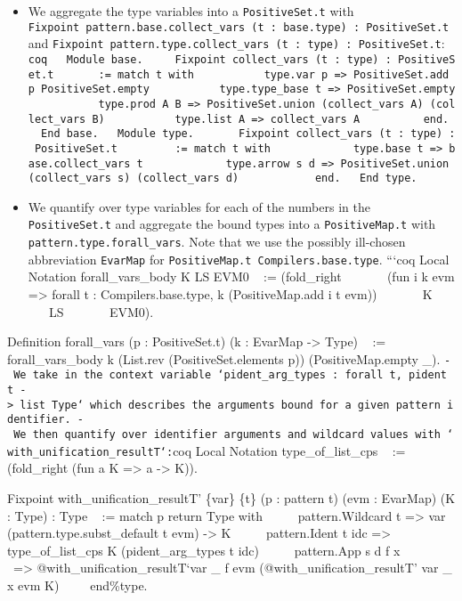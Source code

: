 \begin{itemize}
  \begin{itemize}
  \tightlist
  \item
    We aggregate the type variables into a \texttt{PositiveSet.t} with
    \texttt{Fixpoint\ pattern.base.collect\_vars\ (t\ :\ base.type)\ :\ PositiveSet.t}
    and
    \texttt{Fixpoint\ pattern.type.collect\_vars\ (t\ :\ type)\ :\ PositiveSet.t}:
    \texttt{coq\ \ \ Module\ base.\ \ \ ~\ Fixpoint\ collect\_vars\ (t\ :\ type)\ :\ PositiveSet.t\ \ \ ~\ ~\ :=\ match\ t\ with\ \ \ ~\ ~\ ~\ ~\textbar{}\ type.var\ p\ =\textgreater{}\ PositiveSet.add\ p\ PositiveSet.empty\ \ \ ~\ ~\ ~\ ~\textbar{}\ type.type\_base\ t\ =\textgreater{}\ PositiveSet.empty\ \ \ ~\ ~\ ~\ ~\textbar{}\ type.prod\ A\ B\ =\textgreater{}\ PositiveSet.union\ (collect\_vars\ A)\ (collect\_vars\ B)\ \ \ ~\ ~\ ~\ ~\textbar{}\ type.list\ A\ =\textgreater{}\ collect\_vars\ A\ \ \ ~\ ~\ ~\ ~end.\ \ \ End\ base.\ \ \ Module\ type.\ \ \ ~\ ~\ Fixpoint\ collect\_vars\ (t\ :\ type)\ :\ PositiveSet.t\ \ \ ~\ ~\ ~\ :=\ match\ t\ with\ \ \ ~\ ~\ ~\ ~\ ~\textbar{}\ type.base\ t\ =\textgreater{}\ base.collect\_vars\ t\ \ \ ~\ ~\ ~\ ~\ ~\textbar{}\ type.arrow\ s\ d\ =\textgreater{}\ PositiveSet.union\ (collect\_vars\ s)\ (collect\_vars\ d)\ \ \ ~\ ~\ ~\ ~\ ~end.\ \ \ End\ type.}
  \item
    We quantify over type variables for each of the numbers in the
    \texttt{PositiveSet.t} and aggregate the bound types into a
    \texttt{PositiveMap.t} with \texttt{pattern.type.forall\_vars}. Note
    that we use the possibly ill-chosen abbreviation \texttt{EvarMap}
    for \texttt{PositiveMap.t\ Compilers.base.type}. ```coq Local
    Notation forall\_vars\_body K LS EVM0 ~ := (fold\_right ~ ~ ~ ~ (fun
    i k evm =\textgreater{} forall t : Compilers.base.type, k
    (PositiveMap.add i t evm)) ~ ~ ~ ~ K ~ ~ ~ ~ LS ~ ~ ~ ~ EVM0).
  \end{itemize}

  Definition forall\_vars (p : PositiveSet.t) (k : EvarMap
  -\textgreater{} Type) ~ := forall\_vars\_body k (List.rev
  (PositiveSet.elements p)) (PositiveMap.empty \_).
  \texttt{-\ We\ take\ in\ the\ context\ variable\ `pident\_arg\_types\ :\ forall\ t,\ pident\ t\ -\textgreater{}\ list\ Type`\ which\ describes\ the\ arguments\ bound\ for\ a\ given\ pattern\ identifier.\ -\ We\ then\ quantify\ over\ identifier\ arguments\ and\ wildcard\ values\ with\ `with\_unification\_resultT`:}coq
  Local Notation type\_of\_list\_cps ~ := (fold\_right (fun a K
  =\textgreater{} a -\textgreater{} K)).

  Fixpoint with\_unification\_resultT' \{var\} \{t\} (p : pattern t)
  (evm : EvarMap) (K : Type) : Type ~ := match p return Type with ~ ~
  ~\textbar{} pattern.Wildcard t =\textgreater{} var
  (pattern.type.subst\_default t evm) -\textgreater{} K ~ ~ ~\textbar{}
  pattern.Ident t idc =\textgreater{} type\_of\_list\_cps K
  (pident\_arg\_types t idc) ~ ~ ~\textbar{} pattern.App s d f x ~ ~ ~
  ~=\textgreater{} @with\_unification\_resultT`var \_ f evm
  (@with\_unification\_resultT' var \_ x evm K) ~ ~ ~end\%type.


\end{itemize}
